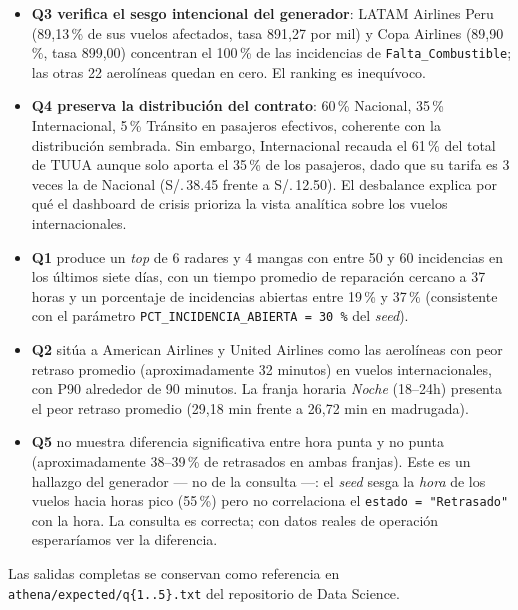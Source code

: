 \begin{itemize}
  \item \textbf{Q3 verifica el sesgo intencional del generador}: LATAM
    Airlines Peru (89,13\,\% de sus vuelos afectados, tasa 891,27 por
    mil) y Copa Airlines (89,90\,\%, tasa 899,00) concentran el
    100\,\% de las incidencias de \texttt{Falta\_Combustible}; las
    otras 22 aerolíneas quedan en cero. El ranking es inequívoco.
  \item \textbf{Q4 preserva la distribución del contrato}: 60\,\%
    Nacional, 35\,\% Internacional, 5\,\% Tránsito en pasajeros
    efectivos, coherente con la distribución sembrada. Sin embargo,
    Internacional recauda el 61\,\% del total de TUUA aunque solo
    aporta el 35\,\% de los pasajeros, dado que su tarifa es 3 veces
    la de Nacional (S/.\,38.45 frente a S/.\,12.50). El desbalance
    explica por qué el dashboard de crisis prioriza la vista analítica
    sobre los vuelos internacionales.
  \item \textbf{Q1} produce un \emph{top} de 6 radares y 4 mangas con
    entre 50 y 60 incidencias en los últimos siete días, con un tiempo
    promedio de reparación cercano a 37 horas y un porcentaje de
    incidencias abiertas entre 19\,\% y 37\,\% (consistente con el
    parámetro \texttt{PCT\_INCIDENCIA\_ABIERTA = 30\,\%} del
    \emph{seed}).
  \item \textbf{Q2} sitúa a American Airlines y United Airlines como
    las aerolíneas con peor retraso promedio (aproximadamente 32
    minutos) en vuelos internacionales, con P90 alrededor de 90
    minutos. La franja horaria \emph{Noche} (18--24h) presenta el peor
    retraso promedio (29,18 min frente a 26,72 min en madrugada).
  \item \textbf{Q5} no muestra diferencia significativa entre hora
    punta y no punta (aproximadamente 38--39\,\% de retrasados en
    ambas franjas). Este es un hallazgo del generador --- no de la
    consulta ---: el \emph{seed} sesga la \emph{hora} de los vuelos
    hacia horas pico (55\,\%) pero no correlaciona el
    \texttt{estado = "Retrasado"} con la hora. La consulta es
    correcta; con datos reales de operación esperaríamos ver la
    diferencia.
\end{itemize}

Las salidas completas se conservan como referencia en
\texttt{athena/expected/q\{1..5\}.txt} del repositorio de Data Science.



